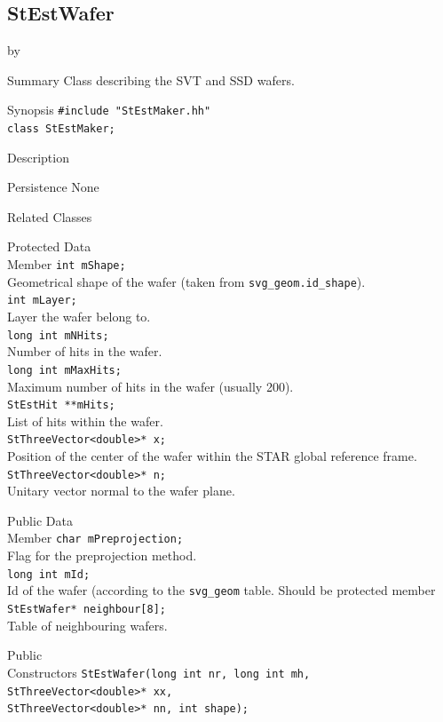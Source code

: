 \documentclass[twoside]{article}
\newcommand{\entrylabel}[1]{\mbox{\textbf{{#1}}}\hfil}%
\newenvironment{entry}
{\begin{list}{}%
    {\renewcommand{\makelabel}{\entrylabel}%
     \setlength{\labelwidth}{90pt}%
     \setlength{\leftmargin}{\labelwidth}
     \advance\leftmargin by \labelsep%
      }%
    }%
  {\end{list}}
\newcommand{\Entrylabel}[1]%
{\raisebox{0pt}[1ex][0pt]{\makebox[\labelwidth][l]%
    {\parbox[t]{\labelwidth}{\hspace{0pt}\textbf{{#1}}}}}}
\newenvironment{Entry}%
{\renewcommand{\entrylabel}{\Entrylabel}\begin{entry}}%
  {\end{entry}}
\begin{document}
\subsection{StEstWafer}
\label{sec:StestWaferq}
\begin{Entry}
\item[Summary]
Class describing the SVT and SSD wafers.\\
\item[Synopsis]
    \verb+#include "StEstMaker.hh"+\\
    \verb+class StEstMaker;+\\
\item[Description]

\item[Persistence]
    None \\	

\item[Related Classes]
	
\item[Protected Data\\ Member]
    	\verb+int mShape;+\\
    	Geometrical shape of the wafer (taken from \verb+svg_geom.id_shape+).\\
	\verb+int mLayer;+\\
	Layer the wafer belong to. \\	
	\verb+long int mNHits;+\\
	Number of hits in the wafer. \\	
	\verb+long int mMaxHits;+\\
	Maximum number of hits in the wafer (usually 200).\\	
	\verb+StEstHit **mHits;+\\
	List of hits within the wafer. \\	
	\verb+StThreeVector<double>* x;+\\
	Position of the center of the wafer within the STAR global reference frame.\\ 	
	\verb+StThreeVector<double>* n;+\\
	Unitary vector normal to the wafer plane.\\
\item[Public Data\\ Member]
	\verb+char mPreprojection;+\\
	Flag for the preprojection method.\\
	\verb+long int mId;+\\
	Id of the wafer (according to the \verb+svg_geom+ table. Should be protected member\\
	\verb+StEstWafer* neighbour[8];+\\
	Table of neighbouring wafers.\\
\item[Public\\ Constructors]
	\verb+StEstWafer(long int nr, long int mh, StThreeVector<double>* xx,+\\ 
	\verb+StThreeVector<double>* nn, int shape);+\\


\end{Entry}
\end{document}
